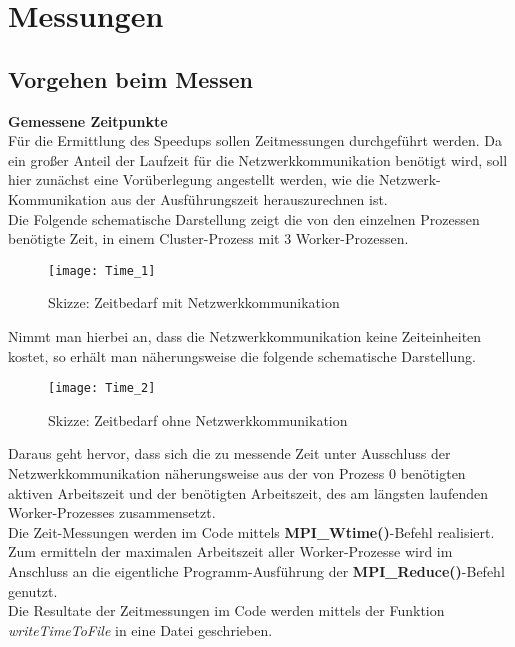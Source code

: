 \documentclass[
10pt, %
a4paper, %
oneside, %
headinclude,footinclude, %
BCOR5mm, %
]{scrartcl}
\begin{document}
\section{Messungen}
\subsection{Vorgehen beim Messen}

\textbf{Gemessene Zeitpunkte}\\
Für die Ermittlung des Speedups sollen Zeitmessungen durchgeführt werden. Da ein großer Anteil der Laufzeit für die Netzwerkkommunikation benötigt wird, soll hier zunächst eine Vorüberlegung angestellt werden, wie die Netzwerk-Kommunikation aus der Ausführungszeit herauszurechnen ist. \\Die Folgende schematische Darstellung zeigt die von den einzelnen Prozessen benötigte Zeit, in einem Cluster-Prozess mit 3 Worker-Prozessen.

\begin{figure}[h]
	\centering 
	\texttt{[image: Time\_1]} 
	\caption[Skizze: Zeitbedarf mit Netzwerkkommunikation]{Skizze: Zeitbedarf mit Netzwerkkommunikation }
	
\end{figure}

Nimmt man hierbei an, dass die Netzwerkkommunikation keine Zeiteinheiten kostet, so erhält man näherungsweise die folgende schematische Darstellung.

\begin{figure}[h]
	\centering 
	\texttt{[image: Time\_2]} 
	\caption[Skizze: Zeitbedarf ohne Netzwerkkommunikation]{Skizze: Zeitbedarf ohne Netzwerkkommunikation}
	
\end{figure}

Daraus geht hervor, dass sich die zu messende Zeit unter Ausschluss der Netzwerkkommunikation näherungsweise aus der von Prozess 0 benötigten aktiven Arbeitszeit und der benötigten Arbeitszeit, des am längsten laufenden Worker-Prozesses zusammensetzt.\\
Die Zeit-Messungen werden im Code mittels \textbf{MPI\_Wtime()}-Befehl realisiert. Zum ermitteln der maximalen Arbeitszeit aller Worker-Prozesse wird im Anschluss an die eigentliche Programm-Ausführung der \textbf{MPI\_Reduce()}-Befehl genutzt.\\
Die Resultate der Zeitmessungen im Code werden mittels der Funktion \textit{writeTimeToFile} in eine Datei geschrieben.\\
\end{document}
